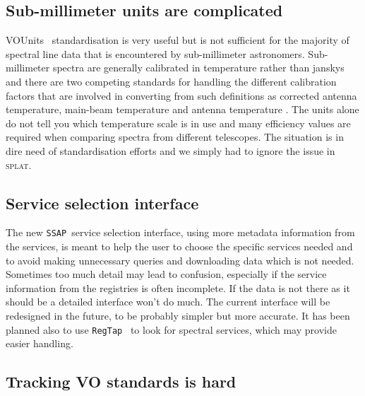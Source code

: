 \documentclass[final,authoryear,5p,times,twocolumn]{elsarticle}
\newcommand{\ssap}{\texttt{SSAP}}
\newcommand{\regtap}{\texttt{RegTap}}
\newcommand{\vounits}{VOUnits}
\newcommand{\splat}{\textsc{splat}}
\begin{document}
\subsection{Sub-millimeter units are complicated}

\vounits\ \citep{vounits} standardisation is very useful but is not
sufficient for the majority of spectral line data that is encountered
by sub-millimeter astronomers. Sub-millimeter spectra are generally
calibrated in temperature rather than janskys and there are two
competing standards for handling the different calibration factors
that are involved in converting from such definitions as corrected
antenna temperature, main-beam temperature and antenna temperature
\citep{1981ApJ...250..341K,1989LNP...333..351D,2009tra..book.....W}. The
units alone do not tell you which temperature scale is in use and many
efficiency values are required when comparing spectra from different
telescopes. The situation is in dire need of standardisation efforts
and we simply had to ignore the issue in \splat.

\subsection{Service selection interface}

The new \ssap\ service selection interface, using more metadata
information from the services, is meant to help the user to choose the
specific services needed and to avoid making unnecessary queries and
downloading data which is not needed. Sometimes too much detail may
lead to confusion, especially if the service information from the
registries is often incomplete. If the data is not there as it should
be a detailed interface won't do much. The current interface will be
redesigned in the future, to be probably simpler but more accurate. It has
been planned also to use \regtap\ \citep{regtap} to look for spectral services, which
may provide easier handling.

\subsection{Tracking VO standards is hard}
\end{document}
